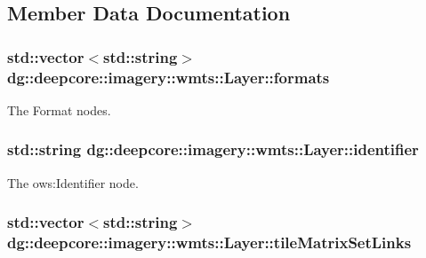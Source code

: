 \subsection{Member Data Documentation}
\subsubsection[{\texorpdfstring{formats}{formats}}]{\setlength{\rightskip}{0pt plus 5cm}std\+::vector$<$std\+::string$>$ dg\+::deepcore\+::imagery\+::wmts\+::\+Layer\+::formats}\hypertarget{structdg_1_1deepcore_1_1imagery_1_1wmts_1_1_layer_a69d7446036c9e705673b24ef910f3702}{}\label{structdg_1_1deepcore_1_1imagery_1_1wmts_1_1_layer_a69d7446036c9e705673b24ef910f3702}


The Format nodes. 

\subsubsection[{\texorpdfstring{identifier}{identifier}}]{\setlength{\rightskip}{0pt plus 5cm}std\+::string dg\+::deepcore\+::imagery\+::wmts\+::\+Layer\+::identifier}\hypertarget{structdg_1_1deepcore_1_1imagery_1_1wmts_1_1_layer_a903488a9e9c3157e8fb371a2f639ace8}{}\label{structdg_1_1deepcore_1_1imagery_1_1wmts_1_1_layer_a903488a9e9c3157e8fb371a2f639ace8}


The ows\+:Identifier node. 

\subsubsection[{\texorpdfstring{tile\+Matrix\+Set\+Links}{tileMatrixSetLinks}}]{\setlength{\rightskip}{0pt plus 5cm}std\+::vector$<$std\+::string$>$ dg\+::deepcore\+::imagery\+::wmts\+::\+Layer\+::tile\+Matrix\+Set\+Links}\hypertarget{structdg_1_1deepcore_1_1imagery_1_1wmts_1_1_layer_a1b3f111751a740773df1ccb0039e587e}{}\label{structdg_1_1deepcore_1_1imagery_1_1wmts_1_1_layer_a1b3f111751a740773df1ccb0039e587e}



